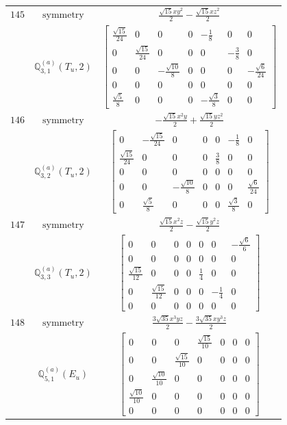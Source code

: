 \documentclass[fleqn,8pt,landscape]{jsarticle}
\begin{document}
\begin{longtable}{ccc}
$ 145 $ & $ \text{symmetry} $ & $ \frac{\sqrt{15} x y^{2}}{2} - \frac{\sqrt{15} x z^{2}}{2} $ \\
$  $ & $ \mathbb{Q}_{3,1}^{(a)}(T_{u},2) $ & $ \begin{bmatrix} \frac{\sqrt{15}}{24} & 0 & 0 & 0 & - \frac{1}{8} & 0 & 0 \\ 0 & \frac{\sqrt{15}}{24} & 0 & 0 & 0 & - \frac{3}{8} & 0 \\ 0 & 0 & - \frac{\sqrt{10}}{8} & 0 & 0 & 0 & - \frac{\sqrt{6}}{24} \\ 0 & 0 & 0 & 0 & 0 & 0 & 0 \\ \frac{\sqrt{5}}{8} & 0 & 0 & 0 & - \frac{\sqrt{3}}{8} & 0 & 0 \end{bmatrix} $ \\ \hline
$ 146 $ & $ \text{symmetry} $ & $ - \frac{\sqrt{15} x^{2} y}{2} + \frac{\sqrt{15} y z^{2}}{2} $ \\
$  $ & $ \mathbb{Q}_{3,2}^{(a)}(T_{u},2) $ & $ \begin{bmatrix} 0 & - \frac{\sqrt{15}}{24} & 0 & 0 & 0 & - \frac{1}{8} & 0 \\ \frac{\sqrt{15}}{24} & 0 & 0 & 0 & \frac{3}{8} & 0 & 0 \\ 0 & 0 & 0 & 0 & 0 & 0 & 0 \\ 0 & 0 & - \frac{\sqrt{10}}{8} & 0 & 0 & 0 & \frac{\sqrt{6}}{24} \\ 0 & \frac{\sqrt{5}}{8} & 0 & 0 & 0 & \frac{\sqrt{3}}{8} & 0 \end{bmatrix} $ \\ \hline
$ 147 $ & $ \text{symmetry} $ & $ \frac{\sqrt{15} x^{2} z}{2} - \frac{\sqrt{15} y^{2} z}{2} $ \\
$  $ & $ \mathbb{Q}_{3,3}^{(a)}(T_{u},2) $ & $ \begin{bmatrix} 0 & 0 & 0 & 0 & 0 & 0 & - \frac{\sqrt{6}}{6} \\ 0 & 0 & 0 & 0 & 0 & 0 & 0 \\ \frac{\sqrt{15}}{12} & 0 & 0 & 0 & \frac{1}{4} & 0 & 0 \\ 0 & \frac{\sqrt{15}}{12} & 0 & 0 & 0 & - \frac{1}{4} & 0 \\ 0 & 0 & 0 & 0 & 0 & 0 & 0 \end{bmatrix} $ \\ \hline
$ 148 $ & $ \text{symmetry} $ & $ \frac{3 \sqrt{35} x^{3} y z}{2} - \frac{3 \sqrt{35} x y^{3} z}{2} $ \\
$  $ & $ \mathbb{Q}_{5,1}^{(a)}(E_{u}) $ & $ \begin{bmatrix} 0 & 0 & 0 & \frac{\sqrt{15}}{10} & 0 & 0 & 0 \\ 0 & 0 & \frac{\sqrt{15}}{10} & 0 & 0 & 0 & 0 \\ 0 & \frac{\sqrt{10}}{10} & 0 & 0 & 0 & 0 & 0 \\ \frac{\sqrt{10}}{10} & 0 & 0 & 0 & 0 & 0 & 0 \\ 0 & 0 & 0 & 0 & 0 & 0 & 0 \end{bmatrix} $ \\ \hline

\end{longtable}
\end{document}
